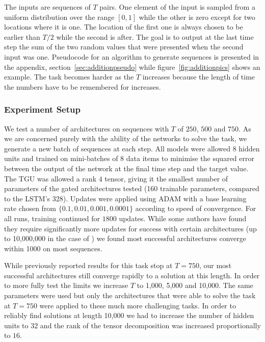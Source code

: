 The inputs are sequences of \(T\) pairs. One element of the input is sampled from a uniform
distribution over the range \([0,1]\) while the other is zero except for two locations where it is one.
The location of the first one is always chosen to be earlier than \(T/2\) while the second is after.
The goal is to output at the last time step the sum of the two random values that were presented when the
second input was one. Pseudocode for an algorithm to generate sequences is presented in the appendix,
section~\ref{sec:additionpseudo} while figure~\ref{fig:additionpics} shows an example.
The task becomes harder as the \(T\) increases because the length of time the numbers have to
be remembered for increases.

\subsubsection{Experiment Setup}
We test a number of architectures on sequences with \(T\) of \(250\), \(500\) and \(750\). As we are
concerned purely with the ability of the networks to solve the task, we generate a new batch of
sequences at each step. All models were allowed \(8\) hidden units and trained on mini-batches of \(8\)
data items to minimise the squared error between the output of the network at the final time step and
the target value. The TGU was allowed a rank \(4\) tensor, giving it the smallest number of parameters
of the gated architectures tested (160 trainable parameters, compared to the LSTM's 328).
Updates were applied using ADAM \autocite{Kingma2014} with a base learning rate chosen
from \(\{0.1, 0.01, 0.001, 0.0001\}\) according to speed of convergence. For all runs, training continued
for \(1800\) updates. While some authors have found they require significantly more updates for success
with certain architectures (up to 10,000,000 in the case of \autocite{Le2015}) we found most successful
architectures converge within 1000 on most sequences.

While previously reported results for this task stop at \(T=750\), our most successful architectures still
converge rapidly to a solution at this length. In order to more fully test the limits we increase
\(T\) to 1,000, 5,000 and 10,000. The same parameters were used but only the architectures that
were able to solve the task at \(T=750\) were applied to these much more challenging tasks. In order
to reliably find solutions at length 10,000 we had to increase the number of hidden units to \(32\) and the
rank of the tensor decomposition was increased proportionally to \(16\).

